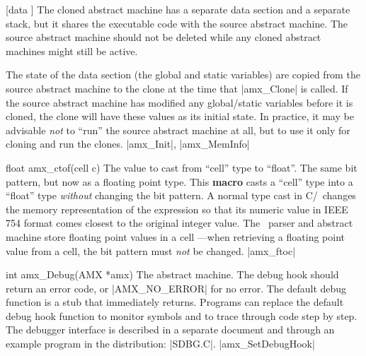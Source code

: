      [data \midtilde]
    The cloned abstract machine has a separate data section and a separate
    stack, but it shares the executable code with the source abstract machine.
    The source abstract machine should not be deleted while any cloned
    abstract machines might still be active.

    The state of the data section (the global and static variables) are copied
    from the source abstract machine to the clone at the time that |amx_Clone|
    is called. If the source abstract machine has modified any global\slash static
    variables before it is cloned, the clone will have these values as its
    initial state. In practice, it may be advisable {\it not\/} to ``run'' the
    source abstract machine at all, but to use it only for cloning and run the
    clones.
\seealso
    |amx_Init|, |amx_MemInfo|

\syntaxp float amx_ctof(cell c)
        The value to cast from ``cell'' type to ``float''.
\returns
    The same bit pattern, but now as a floating point type.
\notes
    This {\bf macro} casts a ``cell'' type into a ``float'' type {\it without\/}
    changing the bit pattern. A normal type cast in C/\Cpp\ changes the memory
    representation of the expression so that its numeric value in IEEE 754
    format comes closest to the original integer value. The \Small\ parser and
    abstract machine store floating point values in a cell ---when retrieving a
    floating point value from a cell, the bit pattern must {\it not\/} be
    changed.
\seealso |amx_ftoc|

\syntaxp int amx_Debug(AMX *amx)
        The abstract machine.
\returns
    The debug hook should return an error code, or |AMX_NO_ERROR| for no error.
\notes
    The default debug function is a stub that immediately returns. Programs can
    replace the default debug hook function to monitor symbols and to trace
    through code step by step. The debugger interface is described in a
    separate document and through an example program in the distribution:
    |SDBG.C|.
\seealso |amx_SetDebugHook|

